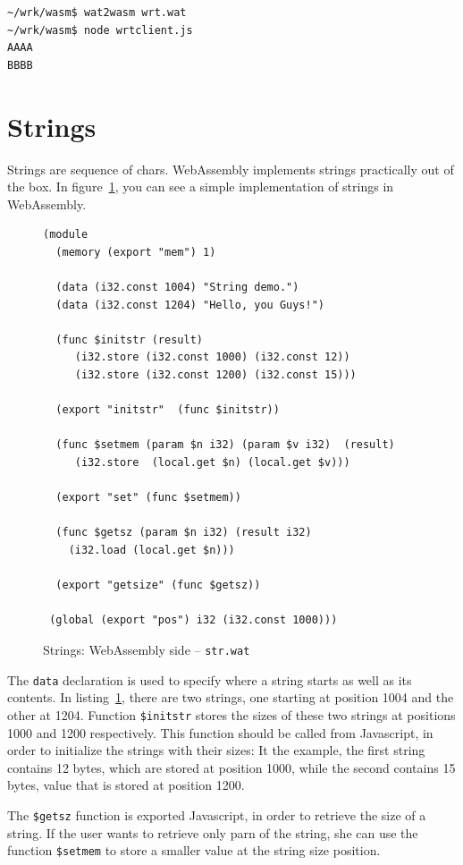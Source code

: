 \documentclass[a4paper,12pt]{book}
\begin{document}
\begin{verbatim}
~/wrk/wasm$ wat2wasm wrt.wat
~/wrk/wasm$ node wrtclient.js
AAAA
BBBB
\end{verbatim}

\section{Strings}
Strings are sequence of chars. WebAssembly
implements strings practically out of the box.
In figure~\ref{wasm:strings}, you can see a simple
implementation of strings in WebAssembly.
\begin{figure}[!h]
\begin{verbatim}
(module
  (memory (export "mem") 1)

  (data (i32.const 1004) "String demo.")
  (data (i32.const 1204) "Hello, you Guys!")

  (func $initstr (result)
     (i32.store (i32.const 1000) (i32.const 12))
     (i32.store (i32.const 1200) (i32.const 15)))

  (export "initstr"  (func $initstr))
 
  (func $setmem (param $n i32) (param $v i32)  (result)
     (i32.store  (local.get $n) (local.get $v)))
  
  (export "set" (func $setmem))

  (func $getsz (param $n i32) (result i32)
    (i32.load (local.get $n)))

  (export "getsize" (func $getsz))

 (global (export "pos") i32 (i32.const 1000)))
\end{verbatim}
  \caption{Strings: WebAssembly side -- {\tt str.wat}}
  \label{wasm:strings}
\end{figure}

The \verb|data| declaration is used to specify
where a string starts as well as its contents.
In listing~\ref{wasm:strings}, there are two
strings, one starting at position 1004 and the
other at 1204. Function \verb|$initstr| stores
the sizes of these two strings at positions 1000
and 1200 respectively. This function should be
called from Javascript, in order to initialize
the strings with their sizes: It the example,
the first string contains 12 bytes, which are
stored at position 1000, while the second contains
15 bytes, value that is stored at position 1200.

The \verb|$getsz| function is exported Javascript,
in order to retrieve the size of a string. If
the user wants to retrieve only parn of the string,
she can use the function \verb|$setmem| to store
a smaller value at the string size position.
\end{document}
